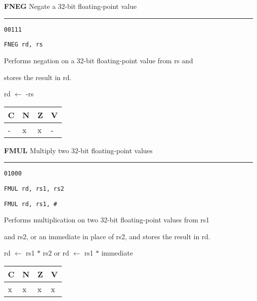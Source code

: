\documentclass{article}
\begin{document}
\bigskip\bigskip

\flushleft
\LARGE\textbf{FNEG} \large \hfill Negate a 32-bit floating-point value

\kern-3pt
\noindent\rule{16.5cm}{0.4pt}
\normalsize

{\large
	 \texttt{00111} \par
	\smallbreak
	 \texttt{FNEG rd, rs} \par
	\smallbreak
	 Performs negation on a 32-bit floating-point value from rs and \par
	\makebox[3.5cm][l]{  } stores the result in rd. \par
	\smallbreak
	 rd $\leftarrow$ -rs \par 
	\smallbreak
	 \begin{tabular}{llll} C \quad & N \quad & Z \quad & V \\ \hline - & x & x & - \\ \end{tabular}
}

\pagebreak

\flushleft
\LARGE\textbf{FMUL} \large \hfill Multiply two 32-bit floating-point values

\kern-3pt
\noindent\rule{16.5cm}{0.4pt}
\normalsize

{\large
	 \texttt{01000} \par
	\smallbreak
	 \texttt{FMUL rd, rs1, rs2} \par
	\smallbreak
	 \texttt{FMUL rd, rs1, \#<18-bit immediate>} \par
	\smallbreak
	 Performs multiplication on two 32-bit floating-point values from rs1 \par
	\makebox[3.5cm][l]{  } and rs2, or an immediate in place of rs2, and stores the result in rd. \par
	\smallbreak
	 rd $\leftarrow$ rs1 $*$ rs2 \quad or \quad rd $\leftarrow$ rs1 $*$ immediate\par
	\smallbreak
	 \begin{tabular}{llll} C \quad & N \quad & Z \quad & V \\ \hline x & x & x & x \\ \end{tabular}
}
\end{document}

